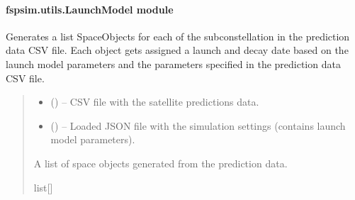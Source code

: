 \documentclass[letterpaper,10pt,english]{sphinxmanual}
\begin{document}
\paragraph{fspsim.utils.LaunchModel module}
\label{\detokenize{fspsim.utils:module-fspsim.utils.LaunchModel}}\label{\detokenize{fspsim.utils:fspsim-utils-launchmodel-module}}

\begin{fulllineitems}
\label{\detokenize{fspsim.utils:fspsim.utils.LaunchModel.Prediction2SpaceObjects}}
\pysigstartsignatures
{}
\pysigstopsignatures
\sphinxAtStartPar
Generates a list SpaceObjects for each of the sub\sphinxhyphen{}constellation in the prediction data CSV file.
Each object gets assigned a launch and decay date based on the launch model parameters and the parameters
specified in the prediction data CSV file.
\begin{quote}\begin{description}
\begin{itemize}
\item {} 
\sphinxAtStartPar
{} () – CSV file with the satellite predictions data.

\item {} 
\sphinxAtStartPar
{} () – Loaded JSON file with the simulation settings (contains launch model parameters).

\end{itemize}

\sphinxAtStartPar
A list of space objects generated from the prediction data.

\sphinxAtStartPar
list{[}{\hyperref[\detokenize{fspsim.utils:fspsim.utils.SpaceObject.SpaceObject}]{}}{]}

\end{description}\end{quote}

\end{fulllineitems}
\end{document}
